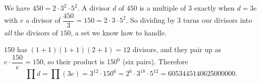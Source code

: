 We have $450=2\cdot3^2\cdot5^2$. A divisor $d$ of $450$ is a multiple of $3$ exactly when $d=3e$ with $e$ a divisor of $\dfrac{450}{3}=150=2\cdot3\cdot5^2$. So dividing by $3$ turns our divisors into \emph{all} the divisors of $150$, a set we know how to handle.

$150$ has $(1+1)(1+1)(2+1)=12$ divisors, and they pair up as $e\cdot\dfrac{150}{e}=150$, so their product is $150^{6}$ (six pairs). Therefore
\[
\prod d=\prod(3e)=3^{12}\cdot150^6=2^6\cdot3^{18}\cdot5^{12}=\boxed{6053445140625000000}.
\]
